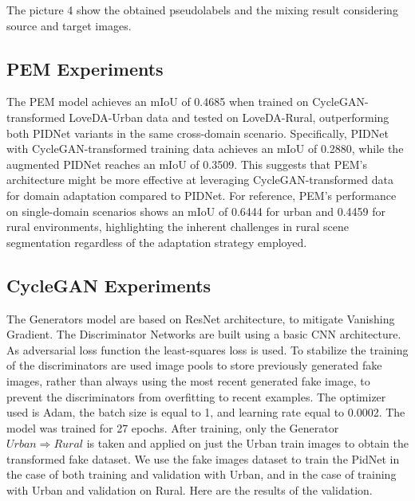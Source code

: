 \documentclass[10pt,twocolumn,letterpaper]{article}
\begin{document}
The picture 4 show the obtained pseudolabels and the mixing result considering source and target images. 


\subsection{PEM Experiments}
The PEM model achieves an mIoU of 0.4685 when trained on CycleGAN-transformed LoveDA-Urban data and tested on LoveDA-Rural, outperforming both PIDNet variants in the same cross-domain scenario. Specifically, PIDNet with CycleGAN-transformed training data achieves an mIoU of 0.2880, while the augmented PIDNet reaches an mIoU of 0.3509. This suggests that PEM's architecture might be more effective at leveraging CycleGAN-transformed data for domain adaptation compared to PIDNet. For reference, PEM's performance on single-domain scenarios shows an mIoU of 0.6444 for urban and 0.4459 for rural environments, highlighting the inherent challenges in rural scene segmentation regardless of the adaptation strategy employed.

\begin{table}[H]
\centering
{}
\caption{Performance of PEM Model with Different Training and Test Sets}
\end{table}

\subsection{CycleGAN Experiments}
The Generators model are based on ResNet architecture, to mitigate Vanishing Gradient. The Discriminator Networks are built using a basic CNN architecture. As adversarial loss function the least-squares loss is used. To stabilize the training of the discriminators are used image pools to store previously generated fake images, rather than always using the most recent generated fake image, to prevent the discriminators from overfitting to recent examples. The optimizer used is Adam, the batch size is equal to 1, and learning rate equal to 0.0002. The model was trained for 27 epochs. 
After training, only the Generator $Urban \Rightarrow Rural$
is taken and applied on just the Urban train images to obtain the transformed fake dataset.
We use the fake images dataset to train the PidNet in the case of both training and validation with Urban, and in the case of training with Urban and validation on Rural. Here are the results of the validation.
\end{document}
